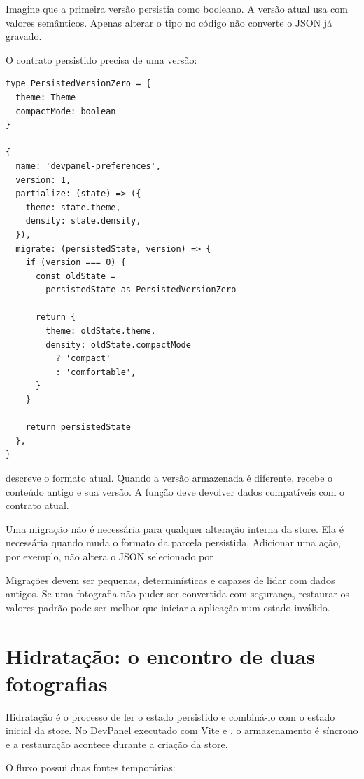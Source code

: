 Imagine que a primeira versão persistia  como booleano. A
versão atual usa  com valores semânticos. Apenas alterar o tipo
no código não converte o JSON já gravado.

O contrato persistido precisa de uma versão:

\begin{lstlisting}[caption={Migração do formato antigo para a versão atual.},label={lst:preference-migrate}]
type PersistedVersionZero = {
  theme: Theme
  compactMode: boolean
}

{
  name: 'devpanel-preferences',
  version: 1,
  partialize: (state) => ({
    theme: state.theme,
    density: state.density,
  }),
  migrate: (persistedState, version) => {
    if (version === 0) {
      const oldState =
        persistedState as PersistedVersionZero

      return {
        theme: oldState.theme,
        density: oldState.compactMode
          ? 'compact'
          : 'comfortable',
      }
    }

    return persistedState
  },
}
\end{lstlisting}

 descreve o formato atual. Quando a versão armazenada é
diferente,  recebe o conteúdo antigo e sua versão. A função deve
devolver dados compatíveis com o contrato atual.

Uma migração não é necessária para qualquer alteração interna da store. Ela é
necessária quando muda o formato da parcela persistida. Adicionar uma ação, por
exemplo, não altera o JSON selecionado por .

Migrações devem ser pequenas, determinísticas e capazes de lidar com dados
antigos. Se uma fotografia não puder ser convertida com segurança, restaurar os
valores padrão pode ser melhor que iniciar a aplicação num estado inválido.

\section{Hidratação: o encontro de duas fotografias}

Hidratação é o processo de ler o estado persistido e combiná-lo com o estado
inicial da store. No DevPanel executado com Vite e , o
armazenamento é síncrono e a restauração acontece durante a criação da store.

O fluxo possui duas fontes temporárias:

